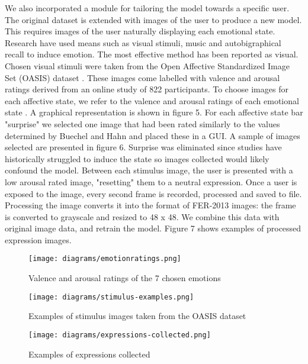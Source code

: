 \documentclass[12pt,a4paper]{article}
\begin{document}
We also incorporated a module for tailoring the model towards a specific user. The original dataset is extended with images of the user to produce a new model. This requires images of the user naturally displaying each emotional state. Research have used means such as visual stimuli, music and autobigraphical recall to induce emotion. The most effective \cite{siedlecka2019experimental} method has been reported as visual. Chosen visual stimuli were taken from the Open Affective Standardized Image Set (OASIS) dataset \cite{kurdi2017introducing}. These images come labelled with valence and arousal ratings derived from an online study of 822 participants. To choose images for each affective state, we refer to the valence and arousal ratings of each emotional state \cite{buechel2016emotion}. A graphical representation is shown in figure 5. For each affective state bar "surprise" we selected one image that had been rated similarly to the values determined by Buechel and Hahn and placed these in a GUI. A sample of images selected are presented in figure 6. Surprise was eliminated since studies have historically struggled to induce the state \cite{siedlecka2019experimental} so images collected would likely confound the model. Between each stimulus image, the user is presented with a low arousal rated image, "resetting" them to a neutral expression. Once a user is exposed to the image, every second frame is recorded, processed and saved to file. Processing the image converts it into the format of FER-2013 images: the frame is converted to grayscale and resized to 48 x 48. We combine this data with original image data, and retrain the model. Figure 7 shows examples of processed expression images.

\begin{figure}[h]
	\centerline{\texttt{[image: diagrams/emotionratings.png]}}
	\caption{Valence and arousal ratings of the 7 chosen emotions}
\end{figure}

\begin{figure}[h]
	\centerline{\texttt{[image: diagrams/stimulus-examples.png]}}
	\caption{Examples of stimulus images taken from the OASIS dataset}
\end{figure}

\begin{figure}[h]
	\centerline{\texttt{[image: diagrams/expressions-collected.png]}}
	\caption{Examples of expressions collected}
\end{figure}
\end{document}
